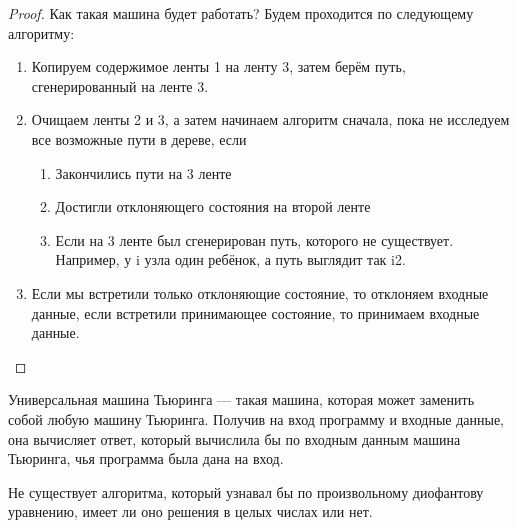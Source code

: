 \begin{proof}
        \par Как такая машина будет работать? Будем проходится по следующему алгоритму:
        \begin{enumerate}
            \item Копируем содержимое ленты 1 на ленту 3, затем берём путь, сгенерированный на ленте 3.
            \item Очищаем ленты 2 и 3, а затем начинаем алгоритм сначала, пока не исследуем все возможные пути в дереве, если
                \begin{enumerate}
                    \item Закончились пути на 3 ленте
                    \item Достигли отклоняющего состояния на второй ленте
                    \item Если на 3 ленте был сгенерирован путь, которого не существует. Например, у i узла один ребёнок, а путь выглядит так i2.
                \end{enumerate}
            \item Если мы встретили только отклоняющие состояние, то отклоняем входные данные, если встретили принимающее состояние, то принимаем входные данные.
        \end{enumerate}
    \end{proof}

        
    \begin{Def} Универсальная машина Тьюринга ---        такая машина, которая может заменить собой любую машину Тьюринга. Получив на вход программу и входные данные, она вычисляет ответ, который вычислила бы по входным данным машина Тьюринга, чья программа была дана на вход.
    \end{Def}
    \begin{Def} 
    \end{Def}

    \begin{Thm}
        Не существует алгоритма, который узнавал бы по произвольному диофантову уравнению, имеет ли оно решения в целых числах или нет.
    \end{Thm}
    

